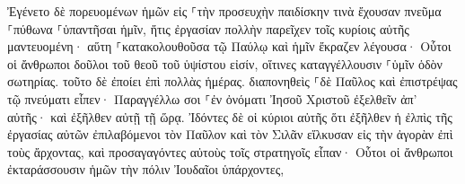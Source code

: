 \documentclass{openreader}
\begin{document}
Ἐγένετο δὲ πορευομένων ἡμῶν εἰς ⸀τὴν προσευχὴν παιδίσκην τινὰ ἔχουσαν πνεῦμα ⸀πύθωνα ⸀ὑπαντῆσαι ἡμῖν, ἥτις ἐργασίαν πολλὴν παρεῖχεν τοῖς κυρίοις αὐτῆς μαντευομένη· 
αὕτη ⸀κατακολουθοῦσα τῷ Παύλῳ καὶ ἡμῖν ἔκραζεν λέγουσα· Οὗτοι οἱ ἄνθρωποι δοῦλοι τοῦ θεοῦ τοῦ ὑψίστου εἰσίν, οἵτινες καταγγέλλουσιν ⸀ὑμῖν ὁδὸν σωτηρίας. 
τοῦτο δὲ ἐποίει ἐπὶ πολλὰς ἡμέρας. διαπονηθεὶς ⸀δὲ Παῦλος καὶ ἐπιστρέψας τῷ πνεύματι εἶπεν· Παραγγέλλω σοι ⸀ἐν ὀνόματι Ἰησοῦ Χριστοῦ ἐξελθεῖν ἀπ’ αὐτῆς· καὶ ἐξῆλθεν αὐτῇ τῇ ὥρᾳ. 
Ἰδόντες δὲ οἱ κύριοι αὐτῆς ὅτι ἐξῆλθεν ἡ ἐλπὶς τῆς ἐργασίας αὐτῶν ἐπιλαβόμενοι τὸν Παῦλον καὶ τὸν Σιλᾶν εἵλκυσαν εἰς τὴν ἀγορὰν ἐπὶ τοὺς ἄρχοντας, 
καὶ προσαγαγόντες αὐτοὺς τοῖς στρατηγοῖς εἶπαν· Οὗτοι οἱ ἄνθρωποι ἐκταράσσουσιν ἡμῶν τὴν πόλιν Ἰουδαῖοι ὑπάρχοντες, 
\end{document}
